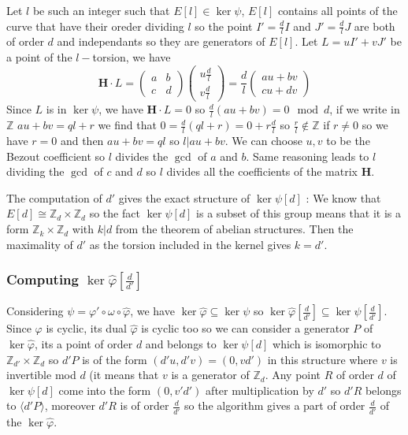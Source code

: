 \documentclass[12pt,a4paper]{article}
\begin{document}
			Let $l$ be such an integer such that $E[l]\in\ker\psi$, $E[l]$ contains all points of the curve
			that have their oreder dividing $l$ so the point $I'=\frac{d}{l}I$ and $J'=\frac{d}{l}J$
			are both of order $d$ and independants so they are generators of $E[l]$.
			Let $L=uI'+vJ'$ be a point of the $l-$torsion, we have \[
				\mathbf H\cdot L=\begin{pmatrix} a & b \\ c & d \end{pmatrix}\begin{pmatrix} u\frac{d}{l} \\ 
			v\frac{d}{l}\end{pmatrix} = \frac{d}{l} \begin{pmatrix} au+bv \\ cu+dv \end{pmatrix} 
			\] 
			Since $L$ is in $\ker\psi$, we have $\mathbf H\cdot L=0$ so  $\frac{d}{l}(au+bv)=0\mod d$, if we
			write in $\mathbb Z$  $au+bv = ql+r$  we find that $0=\frac{d}{l}(ql+r)=0+r\frac{d}{l}$ so
			$\frac{r}{l}\not\in\mathbb{Z}$ if $r\neq 0$ so we have $r=0$ and then $au+bv = ql$ so 
			$l|au+bv$. We can choose  $u,v$ to be the Bezout coefficient so $l$ divides the $\gcd$ of $a$ and
			$b$. Same reasoning leads to  $l$ dividing the $\gcd$ of $c$ and $d$ so  $l$ divides all the
			coefficients of the matrix $\mathbf H$.

			The computation of $d'$ gives the exact structure of $\ker\psi[d]$ : We know that
			$E[d]\cong \mathbb Z_d \times \mathbb Z_d$ so the fact $\ker\psi[d]$ is a subset of this group means
			that it is a form $\mathbb Z_k \times \mathbb Z_d$ with  $k|d$ from the theorem of abelian
			structures. Then the maximality of $d'$ as the torsion included in the kernel gives $k=d'$.
			\subsubsection{Computing $\ker\widehat\varphi[\frac{d}{d'}]$}

			Considering $\psi=\varphi'\circ\omega\circ\widehat\varphi$, we have
			$\ker\widehat\varphi\subseteq\ker\psi$
			so  $\ker\widehat\varphi [\frac{d}{d'}]\subseteq \ker\psi[\frac{d}{d'}]$.
			Since $\varphi$ is cyclic, its dual $\widehat\varphi$ is cyclic too so we can consider a generator
			$P$ of $\ker\widehat\varphi$, its a point of order $d$ and belongs to $\ker\psi[d]$ which is
			isomorphic to $\mathbb Z_{d'} \times \mathbb Z_d$ so $d'P$ is of the form $(d'u,d'v)=(0,vd')$ in
			this structure where $v$ is invertible mod $d$ (it means that $v$ is a generator of $\mathbb Z_d$.
			Any point $R$ of order $d$ of $\ker\psi[d]$ come into the form $(0,v'd')$  after multiplication by
			$d'$ so  $d'R$ belongs to $\langle d'P\rangle$, moreover  $d'R$ is of order $\frac{d}{d'}$ so the
			algorithm gives a part of order $\frac{d}{d'}$ of the $\ker\widehat\varphi$.
			
\end{document}
